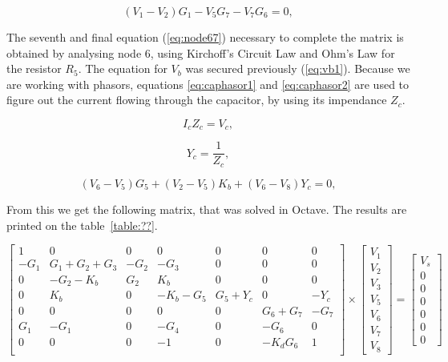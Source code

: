 \begin{equation}
  (V_{1} - V_{2})G_{1} - V_{5}G_{7} - V_{7}G_{6} = 0,
  \label{eq:supernode4}
\end{equation}

The seventh and final equation (\ref{eq:node67}) necessary to complete the matrix is obtained by analysing node 6, using Kirchoff's Circuit Law and Ohm's Law for the resistor $R_5$. The equation for $V_b$ was secured previously (\ref{eq:vb1}). Because we are working with phasors, equations \ref{eq:caphasor1} and \ref{eq:caphasor2} are used to figure out the current flowing through the capacitor, by using its impendance $Z_c$.


\begin{equation}
  I_{c}Z_{c} = V_{c},
  \label{eq:caphasor1}
\end{equation}

\begin{equation}
 Y_c = \frac{1}{Z_c},
  \label{eq:caphasor2}
\end{equation}

\begin{equation}
   (V_{6} - V_{5})G_{5} + (V_{2} - V_{5})K_{b} + (V_{6} - V_{8})Y_{c} = 0,
  \label{eq:node67}
\end{equation}

From this we get the following matrix, that was solved in Octave. The results are printed on the table~\ref{table:??}.

\begin{equation}
\left[ \begin{array}{ccccccc} 
		1 & 0 & 0 & 0 & 0 & 0 & 0 \\ 
		-G_1 & G_1+G_2+G_3 & -G_2 & -G_3 & 0 & 0 & 0 \\
		0 & -G_2-K_b & G_2 & K_b & 0 & 0 & 0 \\ 
		0 & K_b & 0 & -K_b-G_5 & G_5+Y_c & 0 & -Y_c  \\ 
		0 & 0 & 0 & 0 & 0 & G_6+G_7 & -G_7  \\ 
		G_1 & -G_1 & 0 & -G_4 & 0 & -G_6 & 0  \\ 
		0 & 0 & 0 & -1 & 0 & -K_dG_6 & 1 \\ 

\end{array} \right]
\times \left[ \begin{array}{c} V_1 \\ V_2 \\ V_3 \\  V_5 \\ V_6 \\ V_7 \\ V_8 \end{array} \right] =
\left[ \begin{array}{c} V_s \\ 0 \\ 0 \\ 0 \\ 0 \\ 0 \\ 0  \end{array} \right]
\label{eq:nodalmatrix4}
\end{equation}








